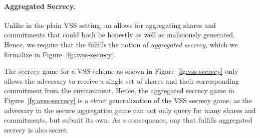 
\paragraph{Aggregated Secrecy.}
Unlike in the plain VSS setting,
an \AVSS allows for aggregating shares and commitments that could both be honestly as well as maliciously generated.
Hence, we require that the \AVSS fulfills the notion of \emph{aggregated secrecy},
which we formalize in Figure~\ref{fg:avss-secrecy}.


\begin{remark}
  The secrecy game for a VSS scheme as shown in Figure~\ref{fg:vss-secrecy} only allows the adversary to receive a single set of shares and their corresponding commitment from the environment.
  Hence, the aggregated secrecy game in Figure~\ref{fg:avss-secrecy} is a strict generalization of the VSS secrecy game,
  as the adversary in the secure aggregation game can not only query for many shares and commitments, but submit its own.
  As a consequence, any \AVSS that fulfills aggregated secrecy is also secret.
\end{remark}


